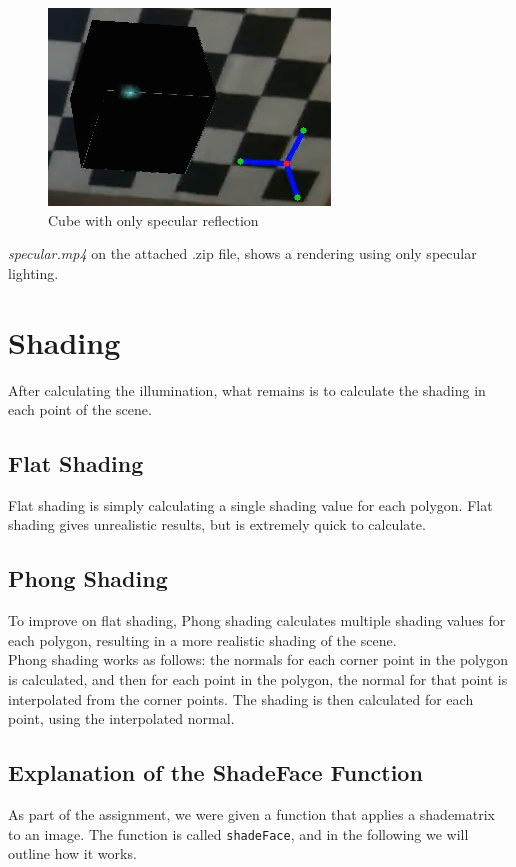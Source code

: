 \documentclass[a4paper,11pt]{article}
\begin{document}
\begin{figure}[H]
  \centering
  \includegraphics[width=0.5\linewidth]{specular}
  \caption{Cube with only specular reflection}
  \label{fig:specular}
\end{figure}



\emph{specular.mp4} on the attached .zip file, shows a rendering using only specular lighting.

\section{Shading}
After calculating the illumination, what remains is to calculate the shading in each point of the scene.
\subsection{Flat Shading}
Flat shading is simply calculating a single shading value for each polygon. Flat shading gives unrealistic results, but is extremely quick to calculate.

\subsection{Phong Shading}
To improve on flat shading, Phong shading calculates multiple shading values for each polygon, resulting in a more realistic shading of the scene.\\

Phong shading works as follows: the normals for each corner point in the polygon is calculated, and then for each point in the polygon, the normal for that point is interpolated from the corner points. The shading is then calculated for each point, using the interpolated normal.\\

\subsection{Explanation of the ShadeFace Function}
As part of the assignment, we were given a function that applies a shadematrix to an image. The function is called \texttt{shadeFace}, and in the following we will outline how it works.
\end{document}
